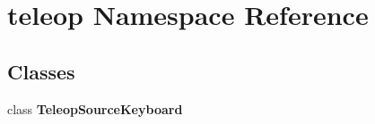 \section{teleop Namespace Reference}
\label{namespaceteleop}
\subsection*{Classes}
\begin{DoxyCompactItemize}
\item 
class {\bf TeleopSourceKeyboard}
\end{DoxyCompactItemize}
